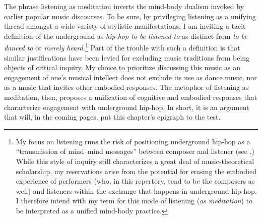 The phrase listening as meditation inverts the mind-body dualism invoked by earlier popular music
discourses. To be sure, by privileging listening as a unifying thread amongst a wide variety of
stylistic manifestations, I am inviting a tacit definition of the underground as \emph{hip-hop to
be listened to} as distinct from \emph{to be danced to} or \emph{merely heard.}\footnote{
    My focus on listening runs the risk of positioning underground hip-hop as a ``transmission of 
    mind--mind messages'' between composer and listener (see 
    \autocite[20]{suzanneg.cusickFeministTheoryMusic1994}.) 
    While this style of inquiry still characterizes a great deal of music-theoretical scholarship,
    my reservations arise from the potential for erasing the embodied experience of performers 
    (who, in this repertory, tend to be the composers as well) and listeners within the exchange 
    that happens in underground hip-hop. I therefore intend with my term for this mode of listening
    (\emph{as meditation}) to be interpreted as a unified mind-body practice.}
Part of the trouble with such a definition is that similar justifications have been levied for excluding
music traditions from being objects of critical inquiry. My choice to prioritize discussing this music 
as an engagement of one's musical intellect does not exclude its use as dance music, nor as a music that
invites other embodied responses. The metaphor of listening as meditation, then, proposes a unification
of cognitive and embodied responses that characterize engagement with underground hip-hop. In short, it is
an argument that will, in the coming pages, put this chapter's epigraph to the test.

